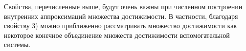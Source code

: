 Свойства, перечисленные выше, будут очень важны при численном построении внутренних
аппроксимаций множества достижимости.  В частности, благодаря свойству 3)
можно приближенно рассматривать множество достижимости как
некоторое конечное объединение множеств достижимости вспомогательной
системы.

